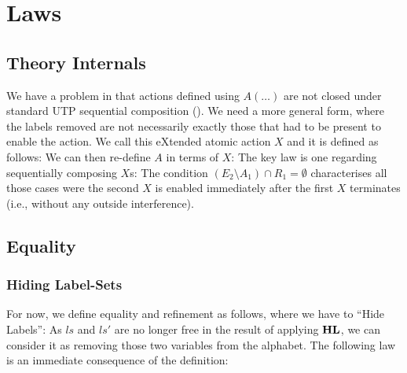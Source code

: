 \section{Laws}\label{sec:laws}

\subsection{Theory Internals}\label{ssec:internals}

We have a problem in that actions defined using $A(\dots)$
are not closed under standard UTP sequential composition ().
We need a more general form,
where the labels removed are not necessarily
exactly those that had to be present to enable the action.
We call this eXtended atomic action $X$ and it is defined as follows:
We can then re-define $A$ in terms of $X$:
The key law is one regarding sequentially composing $X$s:
The condition $(E_2\setminus A_1) \cap R_1 = \emptyset$
characterises all those cases were the second $X$ is enabled
immediately after the first $X$ terminates
(i.e., without any outside interference).

\subsection{Equality}\label{ssec:equality}

\subsubsection{Hiding Label-Sets}\label{sssec:HL}

For now, we define equality and refinement as follows,
where we have to ``Hide Labels'':
As $ls$ and $ls'$ are no longer free in the result of applying $\mathbf{HL}$,
we can consider it as removing those two variables from the alphabet.
The following law is an immediate consequence of the definition:

